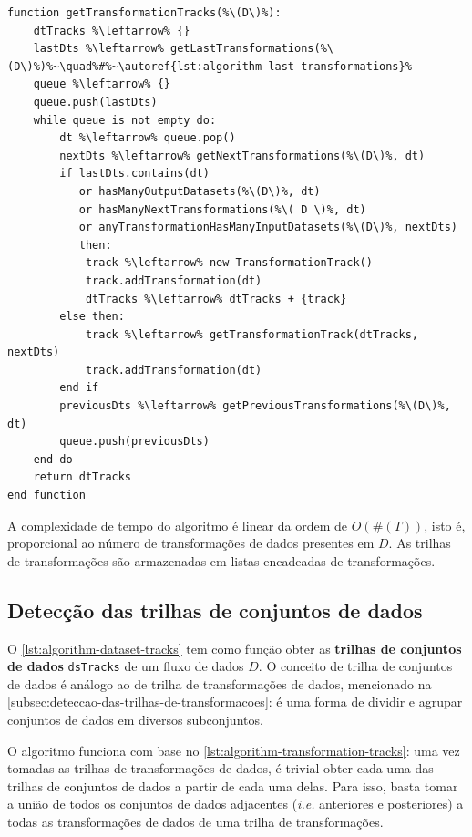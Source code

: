 \begin{minipage}[c]{0.95\textwidth}
\begin{lstlisting}[language=pseudocode,label={lst:algorithm-transformation-tracks},caption={[Detecção das trilhas de transformações]Detecção do rastro do fluxo de dados no nível de trilhas de transformações.}]
function getTransformationTracks(%\(D\)%):
    dtTracks %\leftarrow% {}
    lastDts %\leftarrow% getLastTransformations(%\(D\)%)%~\quad%#%~\autoref{lst:algorithm-last-transformations}%
    queue %\leftarrow% {}
    queue.push(lastDts)
    while queue is not empty do:
        dt %\leftarrow% queue.pop()
        nextDts %\leftarrow% getNextTransformations(%\(D\)%, dt)
        if lastDts.contains(dt)
           or hasManyOutputDatasets(%\(D\)%, dt)
           or hasManyNextTransformations(%\( D \)%, dt)
           or anyTransformationHasManyInputDatasets(%\(D\)%, nextDts)
           then:
            track %\leftarrow% new TransformationTrack()
            track.addTransformation(dt)
            dtTracks %\leftarrow% dtTracks + {track}
        else then:
            track %\leftarrow% getTransformationTrack(dtTracks, nextDts)
            track.addTransformation(dt)
        end if
        previousDts %\leftarrow% getPreviousTransformations(%\(D\)%, dt)
        queue.push(previousDts)
    end do
    return dtTracks
end function
\end{lstlisting}
\end{minipage}

A complexidade de tempo do algoritmo é linear da ordem de \( O(\#(T)) \), isto é, proporcional ao número de transformações de dados presentes em \( D \). As trilhas de transformações são armazenadas em listas encadeadas de transformações.

\subsection{Detecção das trilhas de conjuntos de dados}

O \autoref{lst:algorithm-dataset-tracks} tem como função obter as \textbf{trilhas de conjuntos de dados} \texttt{dsTracks} de um fluxo de dados \( D \). O conceito de trilha de conjuntos de dados é análogo ao de trilha de transformações de dados, mencionado na \autoref{subsec:deteccao-das-trilhas-de-transformacoes}: é uma forma de dividir e agrupar conjuntos de dados em diversos subconjuntos.

O algoritmo funciona com base no \autoref{lst:algorithm-transformation-tracks}: uma vez tomadas as trilhas de transformações de dados, é trivial obter cada uma das trilhas de conjuntos de dados a partir de cada uma delas. Para isso, basta tomar a união de todos os conjuntos de dados adjacentes (\textit{i.e.} anteriores e posteriores) a todas as transformações de dados de uma trilha de transformações.

